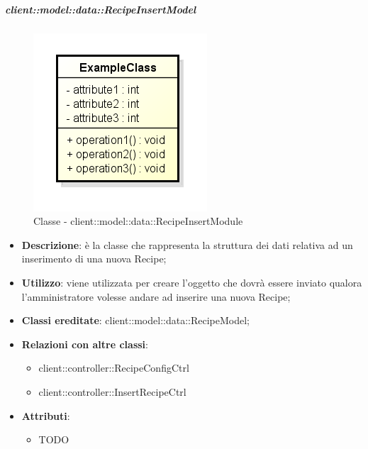 		\subparagraph{client::model::data::RecipeInsertModel} %
		\label{subp:client_model_data_recipeinsertmodel}
			\begin{figure}[htbp]
				\centering
				\centerline{\includegraphics[scale=0.7]{./images/client/classes/example_class.png}}
				\caption{Classe - client::model::data::RecipeInsertModule}
			\end{figure}
			\begin{itemize}
				\item \textbf{Descrizione}: è la classe che rappresenta la struttura dei dati relativa ad un inserimento di una nuova Recipe;
				\item \textbf{Utilizzo}: viene utilizzata per creare l'oggetto che dovrà essere inviato qualora l'amministratore volesse andare ad inserire una nuova Recipe;
				\item \textbf{Classi ereditate}: client::model::data::RecipeModel;
				\item \textbf{Relazioni con altre classi}:
					\begin{itemize}
						\item client::controller::RecipeConfigCtrl
						\item client::controller::InsertRecipeCtrl
					\end{itemize}
				\item \textbf{Attributi}:
					\begin{itemize}
						\item TODO
					\end{itemize}
			\end{itemize}

